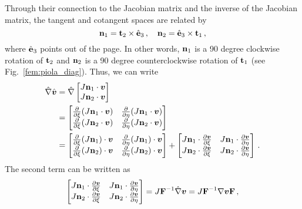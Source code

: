 \documentclass[../doc.tex]{subfiles}
\begin{document}
Through their connection to the Jacobian matrix and the inverse of the Jacobian matrix, the tangent and cotangent spaces are related by 
	\begin{equation}
		\bvec{n}_1 = \bvec{t}_2 \times \hat{\e}_3 \,, \quad \bvec{n}_2 = \hat{\e}_3 \times \bvec{t}_1 \,,
	\end{equation}
where $\hat{\e}_3$ points out of the page. In other words, $\bvec{n}_1$ is a 90 degree clockwise rotation of $\bvec{t}_2$ and $\bvec{n}_2$ is a 90 degree counterclockwise rotation of $\bvec{t}_1$ (see Fig.~\ref{fem:piola_diag}). Thus, we can write 
	\begin{equation}
	\begin{aligned}
		\hnabla\hvec{v} &= \hnabla \begin{bmatrix} 
			J \bvec{n}_1\cdot\vec{v} \\ J \bvec{n}_2 \cdot \vec{v} 
		\end{bmatrix}\\
		&= \begin{bmatrix} 
			\pderiv{}{\xi}(J\bvec{n}_1\cdot\vec{v}) & \pderiv{}{\eta}(J\bvec{n}_1\cdot\vec{v}) \\ 
			\pderiv{}{\xi}(J\bvec{n}_2\cdot\vec{v}) & \pderiv{}{\eta}(J\bvec{n}_2 \cdot \vec{v}) 
		\end{bmatrix} \\
		&= \begin{bmatrix} 
			\pderiv{}{\xi}(J\bvec{n}_1)\cdot\vec{v} & \pderiv{}{\eta}(J\bvec{n}_1)\cdot\vec{v} \\ 
			\pderiv{}{\xi}(J\bvec{n}_2)\cdot\vec{v} & \pderiv{}{\eta}(J\bvec{n}_2)\cdot\vec{v} 
		\end{bmatrix}
		+ \begin{bmatrix} 
			J\bvec{n}_1 \cdot\pderiv{\vec{v}}{\xi} & J\bvec{n}_1 \cdot\pderiv{\vec{v}}{\eta}\\
			J\bvec{n}_2 \cdot\pderiv{\vec{v}}{\xi} & J\bvec{n}_2 \cdot\pderiv{\vec{v}}{\eta}
		\end{bmatrix} \,.
	\end{aligned}
	\end{equation}
The second term can be written as 
	\begin{equation}
		\begin{bmatrix} 
			J\bvec{n}_1 \cdot\pderiv{\vec{v}}{\xi} & J\bvec{n}_1 \cdot\pderiv{\vec{v}}{\eta}\\
			J\bvec{n}_2 \cdot\pderiv{\vec{v}}{\xi} & J\bvec{n}_2 \cdot\pderiv{\vec{v}}{\eta}
		\end{bmatrix}
		= J\mat{F}^{-1}\hnabla\vec{v} = J\mat{F}^{-1}\nabla\vec{v}\mat{F} \,, 
	\end{equation}
\end{document}
